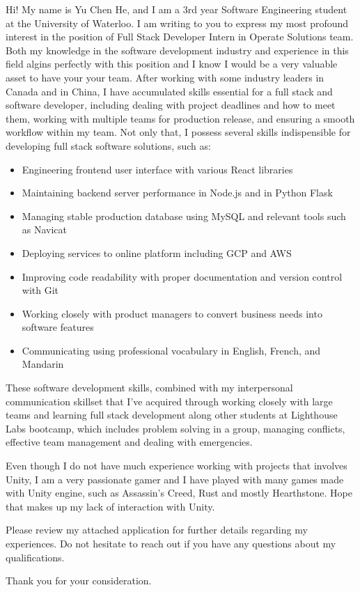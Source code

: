 \documentclass[11pt, a4paper]{awesome-cv}
\begin{document}
\begin{cvletter}
Hi! My name is Yu Chen He, and I am a 3rd year Software Engineering student at the University of Waterloo. I am writing to you to express my
most profound interest in the position of Full Stack Developer Intern in Operate Solutions team. Both my knowledge in the software development industry 
and experience in this field algins perfectly with this position and I know I would be a very valuable asset to have your your team. After working with 
some industry leaders in Canada and in China, I have accumulated skills essential for a full stack and software developer, including dealing with project deadlines and 
how to meet them, working with multiple teams for production release, and ensuring a smooth workflow within my team. Not only that, I possess several skills 
indispensible for developing full stack software solutions, such as:
\begin{itemize}
  \item Engineering frontend user interface with various React libraries
  \item Maintaining backend server performance in Node.js and in Python Flask
  \item Managing stable production database using MySQL and relevant tools such as Navicat
  \item Deploying services to online platform including GCP and AWS
  \item Improving code readability with proper documentation and version control with Git
  \item Working closely with product managers to convert business needs into software features
  \item Communicating using professional vocabulary in English, French, and Mandarin
\end{itemize}

These software development skills, combined with my interpersonal communication skillset that I've acquired through working closely with large teams and 
learning full stack development along other students at Lighthouse Labs bootcamp, which includes problem solving in a group, managing conflicts,
effective team management and dealing with emergencies. 

Even though I do not have much experience working with projects that involves Unity, I am a very passionate gamer and I have played with many games made with Unity engine,
such as Assassin's Creed, Rust and mostly Hearthstone. Hope that makes up my lack of interaction with Unity.

Please review my attached application for further details regarding my experiences. Do not hesitate to reach out if you have any questions about my qualifications.

Thank you for your consideration.

\end{cvletter}


\makeletterclosing
\end{document}
